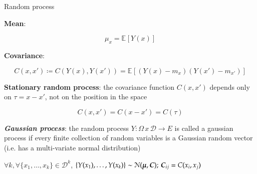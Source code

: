 \documentclass[9pt]{beamer}
\newcommand{\Expectation}[2]{\mathbb{E}_{#1}\left[ #2 \right]}
\begin{document}
\begin{frame}[t]{Random process}

\textbf{Mean}:

\[
\mu_x = \Expectation{}{Y(x)}
\]

\textbf{Covariance}:

\[
C(x,x') \coloneqq C( Y(x), Y(x') ) = \Expectation{}{ ( Y(x) - m_x ) ( Y(x') - m_{x'} ) }
\]

\textbf{Stationary random process}: the covariance function $C(x,x')$ depends only on $\tau = x - x'$, not on the position in the space

\[
C(x, x') = C(x-x') = C(\tau)
\]

\textit{\textbf{Gaussian process}}: the random process $Y: \Omega \, x \, \mathcal{D} \to E$ is called a gaussian process if every finite collection of random variables is a Gaussian random vector (i.e. has a multi-variate normal distribution)

\begin{center}
$\forall k, \forall \{x_1, \dots , x_k \} \in \mathcal{D}^k$, $\{ Y(x_1), \dots , Y(x_k) \} \sim \mathcal{N}( \boldsymbol \mu, \boldsymbol C ); \, \boldsymbol C_{ij} = C(x_i, x_j)$ 
\end{center}


\end{frame}
\end{document}

